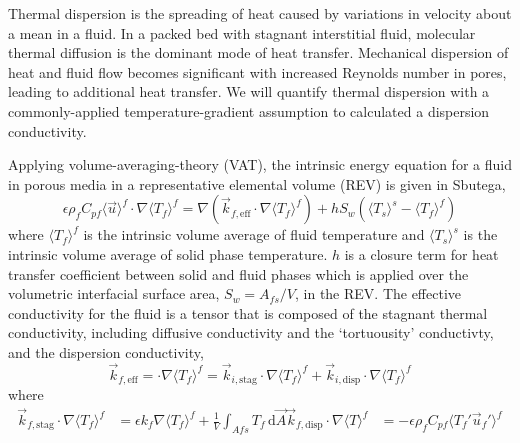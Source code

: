 Thermal dispersion is the spreading of heat caused by variations in velocity about a mean in a fluid. In a packed bed with stagnant interstitial fluid, molecular thermal diffusion is the dominant mode of heat transfer. Mechanical dispersion of heat and fluid flow becomes significant with increased Reynolds number in pores, leading to additional heat transfer. We will quantify thermal dispersion with a commonly-applied temperature-gradient assumption to calculated a dispersion conductivity.\cite{Kuwahara1996,Nakayama2006,Yang2010a}

Applying volume-averaging-theory (VAT), the intrinsic energy equation for a fluid in porous media in a representative elemental volume (REV) is given in Sbutega\etal\cite{Sbutega2013},
\begin{equation}
\epsilon\rho_fC_{pf}\langle\vec{u}\rangle^f\cdot\nabla\langle T_f\rangle^f = \nabla\left(\vec{k}_{f,\text{eff}}\cdot\nabla\langle T_f\rangle^f \right) + hS_w\left(\langle T_s\rangle^s - \langle T_f\rangle^f\right)
\end{equation}
where $\langle T_f\rangle^f$ is the intrinsic volume average of fluid temperature and $\langle T_s\rangle^s$ is the intrinsic volume average of solid phase temperature. $h$ is a closure term for heat transfer coefficient between solid and fluid phases which is applied over the volumetric interfacial surface area, $S_w = A_{fs}/V$, in the REV. The effective conductivity for the fluid is a tensor that is composed of the stagnant thermal conductivity, including diffusive conductivity and the `tortuousity' conductivty, and the dispersion conductivity,
\begin{equation}
\vec{k}_{f,\text{eff}} = \cdot\nabla\langle T_f\rangle^f  = \vec{k}_{i,\text{stag}}\cdot\nabla\langle T_f\rangle^f + \vec{k}_{i,\text{disp}}\cdot\nabla\langle T_f\rangle^f 
\end{equation}
where
\begin{align}
\vec{k}_{f,\text{stag}}\cdot\nabla\langle T_f\rangle^f &= \epsilon k_f \nabla\langle T_f\rangle^f + \frac{1}{V}\int_{Afs}\! T_f \,\mathrm{d}\vec{A}
\vec{k}_{f,\text{disp}} \cdot \nabla \langle T\rangle^f &= -\epsilon\rho_f C_{pf}\langle T_f' \vec{u}_f'\rangle^f
\end{align}


